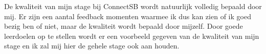 \documentclass{article}
\begin{document}
De kwaliteit van mijn stage bij ConnectSB wordt natuurlijk volledig bepaald door mij. Er zijn een aantal feedback momenten waarmee ik dus kan zien of ik goed bezig ben of niet, maar de kwaliteit wordt bepaald door mijzelf. Door goede leerdoelen op te stellen wordt er een voorbeeld gegeven van de kwaliteit van mijn stage en ik zal mij hier de gehele stage ook aan houden.

\end{document}
